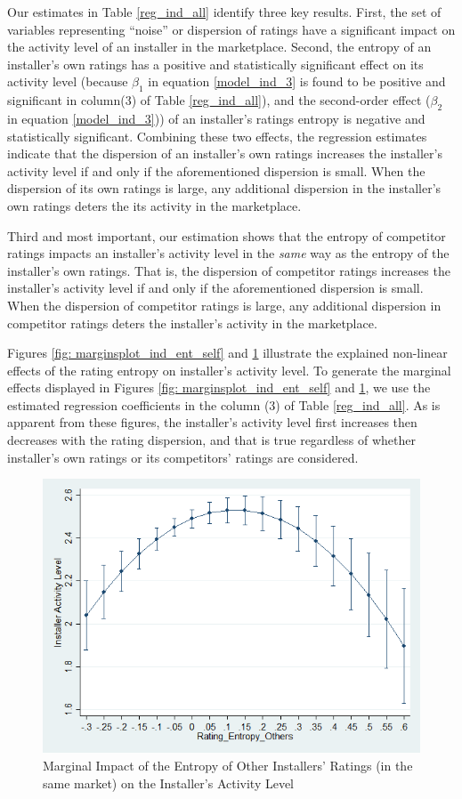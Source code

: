 \documentclass[msom,blindrev]{informs3}
\begin{document}
Our estimates in Table \ref{reg_ind_all} identify three key results. First, the set of variables representing ``noise'' or dispersion of ratings have a significant impact on the activity level of an installer in the marketplace. Second, the entropy of an installer's own ratings has a positive and statistically significant effect on its activity level (because $\beta_{1}$ in equation \eqref{model_ind_3} is found to be positive and significant in column(3) of Table \ref{reg_ind_all}), and the second-order effect ($\beta_{2}$ in equation \eqref{model_ind_3})) of an installer's ratings entropy is negative and statistically significant. Combining these two effects, the regression estimates indicate that the dispersion of an installer's own ratings increases the installer's activity level if and only if the aforementioned dispersion is small. When the dispersion of its own ratings is large, any additional dispersion in the installer's own ratings deters the its activity in the marketplace.

Third and most important, our estimation shows that the entropy of competitor ratings impacts an installer's activity level in the \emph{same} way as the entropy of the installer's own ratings. That is, the dispersion of competitor ratings increases the installer's activity level if and only if the aforementioned dispersion is small. When the dispersion of competitor ratings is large, any additional dispersion in competitor ratings deters the installer's activity in the marketplace.


Figures \ref{fig: marginsplot_ind_ent_self} and  \ref{fig: marginsplot_ind_ent_others} illustrate the explained non-linear effects of the rating entropy on installer's activity level. To generate the marginal effects displayed in Figures \ref{fig: marginsplot_ind_ent_self} and  \ref{fig: marginsplot_ind_ent_others}, we use the estimated regression coefficients in the column (3) of Table \ref{reg_ind_all}. As is apparent from these figures, the installer's activity level first increases then decreases with the rating dispersion, and that is true regardless of whether installer's own ratings or its competitors' ratings are considered.

\begin{figure}
	\centering
	\includegraphics[width=0.7\linewidth]{marginsplot_entothers.png}
	\caption{Marginal Impact of the Entropy of Other Installers' Ratings (in the same market) on the Installer's Activity Level}
	\label{fig: marginsplot_ind_ent_others}
\end{figure}
\end{document}
